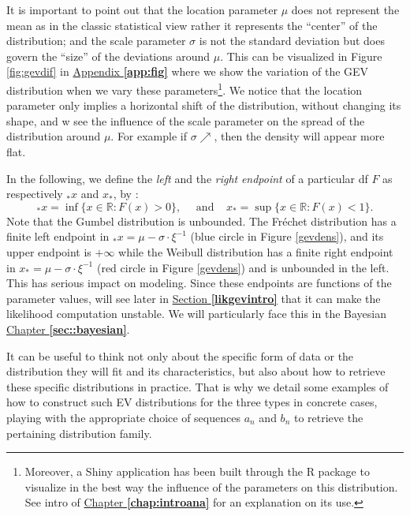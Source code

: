 It is important to point out that the location parameter $\mu$ does not represent
the mean as in the classic statistical view rather it represents the “center” of the distribution; and the scale parameter
$\sigma$ is not the standard deviation but does govern the “size” of the deviations around $\mu$. This can be visualized in Figure \ref{fig:gevdif} in \hyperref[app:fig]{Appendix \textbf{\ref{app:fig}}} where we show the variation of the GEV distribution when we vary these parameters\footnote{Moreover, a Shiny application has been built through the R package to visualize in the best way the influence of the parameters on this distribution. See intro of \hyperref[chap:introana]{Chapter \textbf{\ref{chap:introana}}} for an explanation on its use.}. We notice that the location parameter only implies a horizontal shift of the distribution, without changing its shape, and w see the influence of the scale parameter on the spread of the distribution around $\mu$. For example if $\sigma \nearrow$, then the density will appear more flat.  

In the following, we define the \emph{left} and the \emph{right} \emph{endpoint} of a particular df $F$ as respectively $_*x$ and $x_*$, by :
\begin{equation}\label{eq:endpoints}
_*x=\inf\{x\in\mathbb{R}:F(x)>0\}, \ \ \ \ \ \ \text{and} \ \ \ \ \  x_*=\sup\{x\in\mathbb{R}:F(x)<1\}.
\end{equation}
Note that the Gumbel distribution is unbounded. The Fréchet distribution has a finite left endpoint in $_*x=\mu-\sigma\cdot\xi^{-1}$ (blue circle in Figure \ref{gevdens}), and its upper endpoint is $+\infty$ while the Weibull distribution has a finite right endpoint in $x_*=\mu-\sigma\cdot\xi^{-1}$ (red circle in Figure \ref{gevdens}) and is unbounded in the left. This has serious impact on modeling. Since these endpoints are functions of the parameter values,  will see later in \hyperref[likgevintro]{Section \textbf{\ref{likgevintro}}} that it can make the likelihood computation unstable. We will particularly face this in the Bayesian \hyperref[sec::bayesian]{Chapter\textbf{ \ref{sec::bayesian}}}.

\vspace{.15cm}
It can be useful to think not only about the
specific form of data or the distribution they will fit and its characteristics, but also about how to retrieve these specific distributions in practice. That is why we detail some examples of how to construct such EV distributions for the three types in concrete cases, playing with the appropriate choice of 
sequences $a_n$ and $b_n$ to retrieve the pertaining distribution family.

